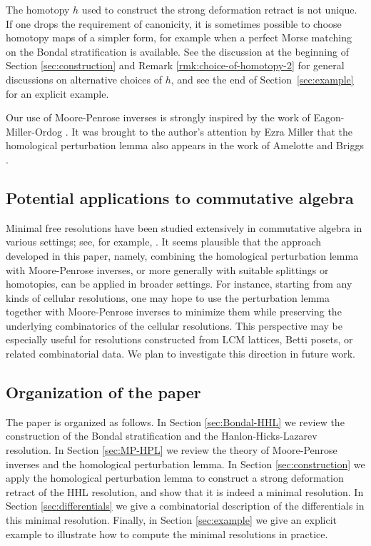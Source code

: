\documentclass[11pt,reqno]{amsart}
\theoremstyle{definition}
\numberwithin{equation}{section}
\begin{document}
\smallskip

The homotopy $h$ used to construct the strong deformation retract is not unique. If one drops the requirement of canonicity, it is sometimes possible to choose homotopy maps of a simpler form, for example when a perfect Morse matching on the Bondal stratification is available. See the discussion at the beginning of Section \ref{sec:construction} and Remark \ref{rmk:choice-of-homotopy-2} for general discussions on alternative choices of $h$, and see the end of Section~\ref{sec:example} for an explicit example.

\smallskip

Our use of Moore-Penrose inverses is strongly inspired by the work of Eagon-Miller-Ordog \cite{EMO}. It was brought to the author's attention by Ezra Miller that the homological perturbation lemma also appears in the work of Amelotte and Briggs \cite{AB23}.

\subsection{Potential applications to commutative algebra}

Minimal free resolutions have been studied extensively in commutative algebra in various settings; see, for example, \cite{Tchernev,AB23,AB25,LMO}. It seems plausible that the approach developed in this paper, namely, combining the homological perturbation lemma with Moore-Penrose inverses, or more generally with suitable splittings or homotopies, can be applied in broader settings. For instance, starting from any kinds of cellular resolutions, one may hope to use the perturbation lemma together with Moore-Penrose inverses to minimize them while preserving the underlying combinatorics of the cellular resolutions. This perspective may be especially useful for resolutions constructed from LCM lattices, Betti posets, or related combinatorial data. We plan to investigate this direction in future work.



\subsection{Organization of the paper}

The paper is organized as follows. In Section \ref{sec:Bondal-HHL} we review the construction of the Bondal stratification and the Hanlon-Hicks-Lazarev resolution. In Section \ref{sec:MP-HPL} we review the theory of Moore-Penrose inverses and the homological perturbation lemma. In Section \ref{sec:construction} we apply the homological perturbation lemma to construct a strong deformation retract of the HHL resolution, and show that it is indeed a minimal resolution. In Section \ref{sec:differentials} we give a combinatorial description of the differentials in this minimal resolution. Finally, in Section \ref{sec:example} we give an explicit example to illustrate how to compute the minimal resolutions in practice.
\end{document}
